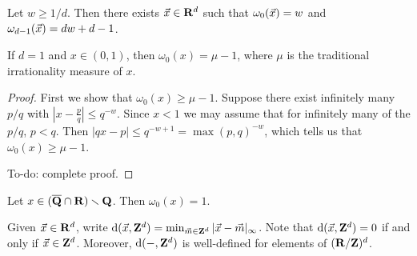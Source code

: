 \begin{theorem}\label{thm:jarnik}
Let $w\geqslant 1/d$. Then there exists $\vec{x}\in \mathbf{R}^d$ such that 
$\omega_0(\vec{x})=w$ and $\omega_{d-1}(\vec{x}) = d w+d-1$. 
\end{theorem}

\begin{theorem}
If $d=1$ and $x\in (0,1)$, then $\omega_0(x) = \mu-1$, where $\mu$ is the 
traditional irrationality measure of $x$. 
\end{theorem}
\begin{proof}
First we show that $\omega_0(x)\geqslant \mu-1$. Suppose there exist infinitely 
many $p/q$ with $\left| x - \frac p q\right| \leqslant q^{-w}$. Since $x<1$ we 
may assume that for infinitely many of the $p/q$, $p<q$. Then 
$| q x - p| \leqslant q^{-w + 1} = \max(p,q)^{-w}$, which tells us that 
$\omega_0(x) \geqslant \mu - 1$. 

To-do: complete proof.
\end{proof}

\begin{theorem}
Let $x\in (\overline{\mathbf{Q}}\cap \mathbf{R})\smallsetminus \mathbf{Q}$. Then 
$\omega_0(x) = 1$. 
\end{theorem}

Given $\vec{x}\in \mathbf{R}^d$, write 
$\mathrm{d}(\vec{x},\mathbf{Z}^d)=\min_{\vec{m}\in \mathbf{Z}^d} |\vec{x}-\vec{m}|_\infty$. Note that 
$\mathrm{d}(\vec{x},\mathbf{Z}^d)=0$ if and only if $\vec{x}\in \mathbf{Z}^d$. Moreover, $\mathrm{d}(-,\mathbf{Z}^d)$ 
is well-defined for elements of $(\mathbf{R}/\mathbf{Z})^d$. 

